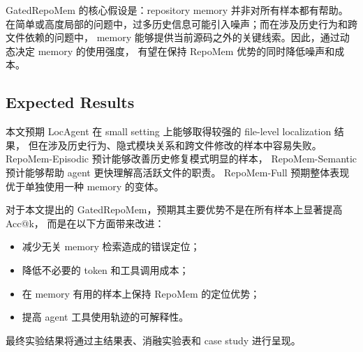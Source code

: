 GatedRepoMem 的核心假设是：repository memory 并非对所有样本都有帮助。
在简单或高度局部的问题中，过多历史信息可能引入噪声；而在涉及历史行为和跨文件依赖的问题中，
memory 能够提供当前源码之外的关键线索。因此，通过动态决定 memory 的使用强度，
有望在保持 RepoMem 优势的同时降低噪声和成本。

\subsection{Expected Results}
\label{subsec:expected_results}

本文预期 LocAgent 在 small setting 上能够取得较强的 file-level localization 结果，
但在涉及历史行为、隐式模块关系和跨文件修改的样本中容易失败。
RepoMem-Episodic 预计能够改善历史修复模式明显的样本，
RepoMem-Semantic 预计能够帮助 agent 更快理解高活跃文件的职责。
RepoMem-Full 预期整体表现优于单独使用一种 memory 的变体。

对于本文提出的 GatedRepoMem，预期其主要优势不是在所有样本上显著提高 Acc@k，
而是在以下方面带来改进：

\begin{itemize}
    \item 减少无关 memory 检索造成的错误定位；
    \item 降低不必要的 token 和工具调用成本；
    \item 在 memory 有用的样本上保持 RepoMem 的定位优势；
    \item 提高 agent 工具使用轨迹的可解释性。
\end{itemize}

最终实验结果将通过主结果表、消融实验表和 case study 进行呈现。